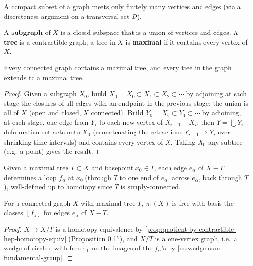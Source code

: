 A compact subset of a graph meets only finitely many vertices and edges (via a
discreteness argument on a transversal set $D$).

\begin{definition}
\label{def:subgraph-and-tree}
A \textbf{subgraph} of $X$ is a closed subspace that is a union of vertices and edges.
A \textbf{tree} is a contractible graph; a tree in $X$ is \textbf{maximal} if it contains every
vertex of $X$.
\end{definition}

\begin{proposition}
\label{prop:maximal-tree-exists}
Every connected graph contains a maximal tree, and every tree in the graph
extends to a maximal tree.
\end{proposition}

\begin{proof}
Given a subgraph $X_0$, build $X_0=X_0\subset X_1\subset X_2\subset\cdots$ by adjoining
at each stage the closures of all edges with an endpoint in the previous stage; the
union is all of $X$ (open and closed, $X$ connected). Build $Y_0=X_0\subset Y_1\subset\cdots$
by adjoining, at each stage, one edge from $Y_i$ to each new vertex of
$X_{i+1}-X_i$; then $Y=\bigcup Y_i$ deformation retracts onto $X_0$ (concatenating the
retractions $Y_{i+1}\to Y_i$ over shrinking time intervals) and contains every vertex
of $X$. Taking $X_0$ any subtree (e.g.\ a point) gives the result.
\end{proof}

Given a maximal tree $T\subset X$ and basepoint $x_0\in T$, each edge $e_\alpha$ of $X-T$
determines a loop $f_\alpha$ at $x_0$ (through $T$ to one end of $e_\alpha$, across $e_\alpha$, back
through $T$), well-defined up to homotopy since $T$ is simply-connected.

\begin{proposition}
\label{prop:fundamental-group-of-graph-is-free}
For a connected graph $X$ with maximal tree $T$, $\pi_1(X)$ is free with basis the
classes $[f_\alpha]$ for edges $e_\alpha$ of $X-T$.
\end{proposition}

\begin{proof}
$X\to X/T$ is a homotopy equivalence by \cref{prop:quotient-by-contractible-hep-homotopy-equiv}
(Proposition 0.17), and $X/T$ is a one-vertex graph, i.e.\ a wedge of circles, with free
$\pi_1$ on the images of the $f_\alpha$'s by \cref{ex:wedge-sum-fundamental-group}.
\end{proof}

